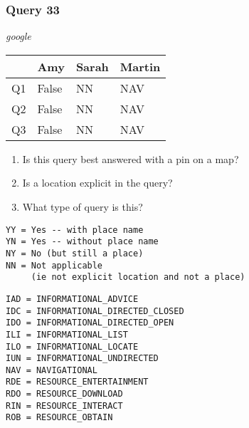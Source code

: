 \begin{frame}[fragile]
\frametitle{Query 33}
\vspace{1em}

\emph{google}

\vfill

\begin{table}
  \centering
  \begin{tabular}{ l l l l }
    & \textbf{Amy} & \textbf{Sarah} & \textbf{Martin}\\
    \toprule
    Q1 & False & NN & NAV\\
Q2 & False & NN & NAV\\
Q3 & False & NN & NAV\\
    \bottomrule
  \end{tabular}
\end{table}

\vfill

\tiny{

\begin{enumerate}
\item Is this query best answered with a pin on a map?
\item Is a location explicit in the query?
\item What type of query is this?
\end{enumerate}

\vfill

\begin{multicols}{2}
\begin{verbatim}
YY = Yes -- with place name
YN = Yes -- without place name
NY = No (but still a place)
NN = Not applicable 
     (ie not explicit location and not a place)
\end{verbatim}

\columnbreak
\begin{verbatim}
IAD = INFORMATIONAL_ADVICE
IDC = INFORMATIONAL_DIRECTED_CLOSED
IDO = INFORMATIONAL_DIRECTED_OPEN
ILI = INFORMATIONAL_LIST
ILO = INFORMATIONAL_LOCATE
IUN = INFORMATIONAL_UNDIRECTED
NAV = NAVIGATIONAL
RDE = RESOURCE_ENTERTAINMENT
RDO = RESOURCE_DOWNLOAD
RIN = RESOURCE_INTERACT
ROB = RESOURCE_OBTAIN
\end{verbatim}
\end{multicols}
}

\end{frame}


